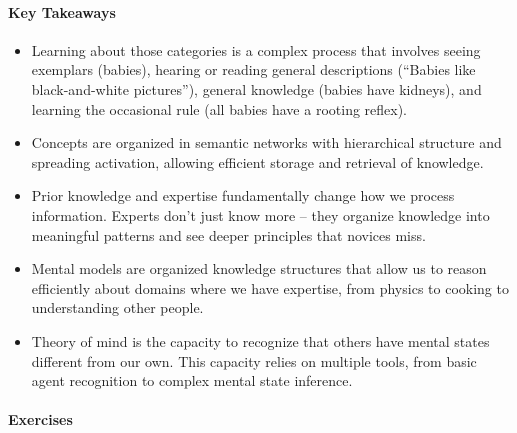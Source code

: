 \documentclass[
]{krantz}
\providecommand{\tightlist}{%
  \setlength{\itemsep}{0pt}\setlength{\parskip}{0pt}}
\begin{document}
\paragraph*{Key Takeaways}\label{key-takeaways-6}

\begin{itemize}
\tightlist
\item
  Learning about those categories is a complex process that involves seeing exemplars (babies), hearing or reading general descriptions (``Babies like black-and-white pictures''), general knowledge (babies have kidneys), and learning the occasional rule (all babies have a rooting reflex).
\item
  Concepts are organized in semantic networks with hierarchical structure and spreading activation, allowing efficient storage and retrieval of knowledge.
\item
  Prior knowledge and expertise fundamentally change how we process information. Experts don't just know more -- they organize knowledge into meaningful patterns and see deeper principles that novices miss.
\item
  Mental models are organized knowledge structures that allow us to reason efficiently about domains where we have expertise, from physics to cooking to understanding other people.
\item
  Theory of mind is the capacity to recognize that others have mental states different from our own. This capacity relies on multiple tools, from basic agent recognition to complex mental state inference.
\end{itemize}

\paragraph*{Exercises}\label{exercises-6}
\end{document}
